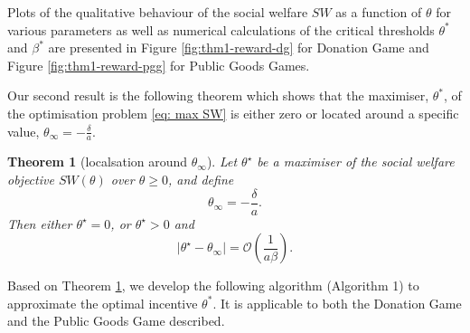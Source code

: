\documentclass{article}
\newtheorem{theorem}{Theorem}
\begin{document}
Plots of the qualitative behaviour of the social welfare $SW$ as a function of $\theta$ for various parameters as well as numerical calculations of the critical thresholds $\theta^*$ and $\beta^*$ are presented in Figure \ref{fig:thm1-reward-dg} for Donation Game and Figure \ref{fig:thm1-reward-pgg} for Public Goods Games.

Our second result is the following theorem which shows that the maximiser, $\theta^*$, of the optimisation problem \eqref{eq: max SW} is either zero or located around a specific value, $\theta_\infty=-\frac{\delta}{a}$.
\begin{theorem}[localsation around $\theta_\infty$]
\label{thm:localization}
Let $\theta^\star$ be a maximiser of the social welfare objective $SW(\theta)$ over $\theta \ge 0$, and define
\[
\theta_\infty = -\frac{\delta}{a}.
\]
Then either $\theta^\star = 0$, or $\theta^\star>0$ and
\[
\bigl|\theta^\star - \theta_\infty\bigr| = \mathcal{O}\!\left(\frac{1}{a\beta}\right).
\]
\end{theorem}


Based on Theorem \ref{thm:localization}, we develop the following algorithm (Algorithm 1) to approximate the optimal incentive $\theta^*$. It is applicable to both the Donation Game and the Public Goods Game described.
\end{document}
